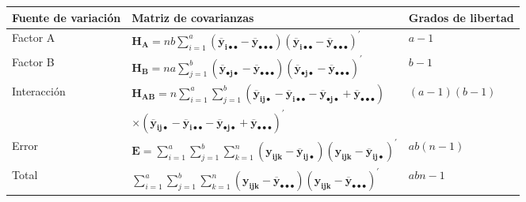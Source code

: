 \documentclass[
  a4paper,
  oneside]{scrbook}
\newcounter{none} %
\theoremstyle{definition}
\theoremstyle{definition}
\theoremstyle{definition}
\theoremstyle{definition}
\theoremstyle{remark}
\begin{document}
{\def\LTcaptype{none} %
\begin{longtable}[]{@{}
  >{\centering\arraybackslash}p{}
  >{\centering\arraybackslash}p{}
  >{\centering\arraybackslash}p{}@{}}
\toprule\noalign{}
\begin{minipage}[b]{\linewidth}\centering
Fuente de variación
\end{minipage} & \begin{minipage}[b]{\linewidth}\centering
Matriz de covarianzas
\end{minipage} & \begin{minipage}[b]{\linewidth}\centering
Grados de libertad
\end{minipage} \\
\midrule\noalign{}
\endhead
\bottomrule\noalign{}
\endlastfoot
Factor A & \({ \bm{H_A} = nb\sum_{i=1}^a\left(\bm{\overline y_{i\bullet\bullet}}-\bm{\overline y_{\bullet\bullet\bullet}}\right)  \left(\bm{\overline y_{i\bullet\bullet}}-\bm{\overline y_{\bullet\bullet\bullet}}\right)^\prime{}}\) & \(a-1\) \\
Factor B & \({ \bm{H_B} = na\sum_{j=1}^b\left(\bm{\overline y_{\bullet j \bullet}}-\bm{\overline y_{\bullet\bullet\bullet}}\right)\left(\bm{\overline y_{\bullet j \bullet}}-\bm{\overline y_{\bullet\bullet\bullet}}\right)^\prime{}}\) & \(b-1\) \\
Interacción & \({ \bm{H_{AB}} = n\sum_{i=1}^a\sum_{j=1}^b\left(\bm{\overline{y}_{ij\bullet}}-\bm{\overline y_{i\bullet\bullet}}-\bm{\overline y_{\bullet j\bullet}}+\bm{\overline y_{\bullet\bullet\bullet}}\right)}\) & \((a-1)(b-1)\) \\
& \({\times \left(\bm{\overline{y}_{ij\bullet}}-\bm{\overline y_{i\bullet\bullet}} -\bm{\overline y_{\bullet j\bullet}}+\bm{\overline y_{\bullet\bullet\bullet}}\right)^\prime{}}\) & \\
Error & \({ \bm{E} = \sum_{i=1}^a \sum_{j=1}^b \sum_{k=1}^n\left( \bm{y_{ijk}}-\bm{\overline y_{ij\bullet}}\right)\left( \bm{y_{ijk}}-\bm{\overline y_{ij\bullet}}\right)^\prime{}}\) & \(ab(n-1)\) \\
Total & \({\sum_{i=1}^a \sum_{j=1}^b \sum_{k=1}^n\left( \bm{y_{ijk}}-\bm{\overline y_{\bullet\bullet\bullet}}\right)\left(  \bm{y_{ijk}}-\bm{\overline y_{\bullet\bullet\bullet}}\right)^\prime{}}\) & \(abn-1\) \\
\end{longtable}
}
\end{document}
